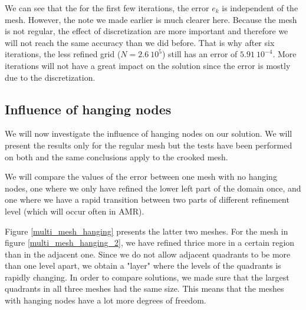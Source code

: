 We can see that the for the first few iterations, the error $e_k$ is independent of the mesh. However, the note we made earlier is much clearer here. Because the mesh is not regular, the effect of discretization are more important and therefore we will not reach the same accuracy than we did before. That is why after six iterations, the less refined grid ($N = 2.6\:10^5$) still has an error of $5.91\:10^{-4}$. More iterations will not have a great impact on the solution since the error is mostly due to the discretization.

\subsection{Influence of hanging nodes}
We will now investigate the influence of hanging nodes on our solution. We will present the results only for the regular mesh but the tests have been performed on both and the same conclusions apply to the crooked mesh.

We will compare the values of the error between one mesh with no hanging nodes, one where we only have refined the lower left part of the domain once, and one where we have a rapid transition between two parts  of different refinement level (which will occur often in AMR).

Figure \ref{multi_mesh_hanging} presents the latter two meshes. For the mesh in figure \ref{multi_mesh_hanging_2}, we have refined thrice more in a certain region than in the adjacent one. Since we do not allow adjacent quadrants to be more than one level apart, we obtain a "layer" where the levels of the quadrants is rapidly changing. In order to compare solutions, we made sure that the largest quadrants in all three meshes had the same size. This means that the meshes with hanging nodes have a lot more degrees of freedom.  

